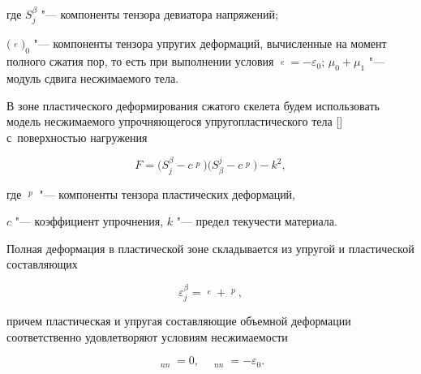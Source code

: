 где $S_{j}^{\beta } $ "--- компоненты тензора девиатора напряжений; 

$\bigl(\mathop{\varepsilon _{j}^{\beta } }\limits^{e} \bigr)_{0} $ "--- компоненты тензора упругих деформаций, вычисленные на момент полного сжатия пор, то есть при выполнении условия $\mathop{\varepsilon _{\alpha }^{\alpha } }\limits^{e} =-\varepsilon _{0} $; $\mu _{0} +\mu _{1} $ "--- модуль сдвига несжимаемого тела. 



В зоне пластического деформирования сжатого скелета будем использовать модель несжимаемого упрочняющегося упругопластического тела [] с~поверхностью нагружения

\begin{equation} \label{eq:gotbuntov_3}

F=\bigl(S_{j}^{\beta } -c\mathop{\varepsilon _{j}^{\beta } }\limits^{p} \bigr)

\bigl(S_{\beta }^{j} -c\mathop{\varepsilon _{\beta }^{j} }\limits^{p} \bigr)-k^{2}, 

\end{equation}                                       

где $\mathop{\varepsilon _{j}^{\beta } }\limits^{p} $ "--- компоненты тензора пластических деформаций, 

$c$ "--- коэффициент упрочнения, $k$ "--- предел текучести материала.



Полная деформация в пластической зоне складывается из упругой и пластической составляющих

\begin{equation} \label{eq:gotbuntov_4}\varepsilon _{j}^{\beta } =\mathop{\varepsilon _{j}^{\beta } }\limits^{e} +\mathop{\varepsilon _{j}^{\beta } }\limits^{p},    \end{equation}                                                       

причем пластическая и упругая составляющие объемной деформации соответственно удовлетворяют условиям несжимаемости 

\begin{equation} \label{eq:gotbuntov_5}  

\mathop{\overset {p }{\varepsilon }} \nolimits_{nn}=0, \quad \mathop{\overset {e}{\varepsilon }} \nolimits_{nn}=-\varepsilon _{0}. 

\end{equation}                                               




